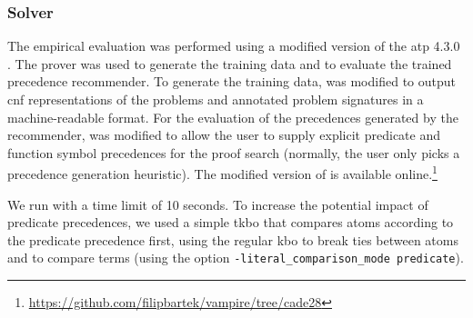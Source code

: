 \subsubsection{Solver}

The empirical evaluation was performed using a modified version of the \gls{atp} \Vampire{} 4.3.0 \cite{DBLP:conf/cav/KovacsV13}.
The prover was used to generate the training data and to evaluate the trained precedence recommender.
To generate the training data,
\Vampire{} was modified to output \gls{cnf} representations of the problems
and annotated problem signatures in a machine-readable format.
For the evaluation of the precedences generated by the recommender,
\Vampire{} was modified to allow the user to supply explicit predicate and function symbol precedences for the proof search
(normally, the user only picks a precedence generation heuristic).
The modified version of \Vampire{} is available online.\footnote{\url{https://github.com/filipbartek/vampire/tree/cade28}}

We run \Vampire{} with a time limit of 10 seconds.
To increase the potential impact of predicate precedences,
we used a simple \gls{tkbo} \cite{Ludwig2007,Kovacs2011}
that compares atoms according to the predicate precedence first,
using the regular \gls{kbo} to break ties between atoms
and to compare terms (using the \Vampire{} option \texttt{-literal\_comparison\_mode predicate}).


